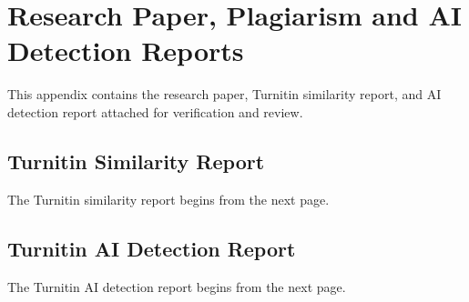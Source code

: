 \documentclass[12pt,a4paper]{report}
\begin{document}




\clearpage
\appendix

\pagestyle{mainstyle}

\chapter{Research Paper, Plagiarism and AI Detection Reports}

This appendix contains the research paper, Turnitin similarity report, and AI detection report attached for verification and review.

\section{Turnitin Similarity Report}

The Turnitin similarity report begins from the next page.



\section{Turnitin AI Detection Report}

The Turnitin AI detection report begins from the next page.



\end{document}

